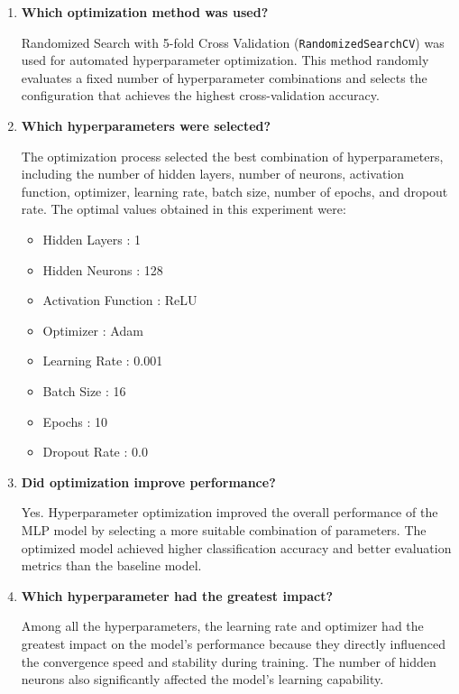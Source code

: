 \documentclass[11pt]{article}
\begin{document}
\begin{enumerate}

\item \textbf{Which optimization method was used?}

Randomized Search with 5-fold Cross Validation (\texttt{RandomizedSearchCV}) was used for automated hyperparameter optimization. This method randomly evaluates a fixed number of hyperparameter combinations and selects the configuration that achieves the highest cross-validation accuracy.

\vspace{0.3cm}

\item \textbf{Which hyperparameters were selected?}

The optimization process selected the best combination of hyperparameters, including the number of hidden layers, number of neurons, activation function, optimizer, learning rate, batch size, number of epochs, and dropout rate. The optimal values obtained in this experiment were:

\begin{itemize}
    \item Hidden Layers : 1
    \item Hidden Neurons : 128
    \item Activation Function : ReLU
    \item Optimizer : Adam
    \item Learning Rate : 0.001
    \item Batch Size : 16
    \item Epochs : 10
    \item Dropout Rate : 0.0
\end{itemize}


\vspace{0.3cm}

\item \textbf{Did optimization improve performance?}

Yes. Hyperparameter optimization improved the overall performance of the MLP model by selecting a more suitable combination of parameters. The optimized model achieved higher classification accuracy and better evaluation metrics than the baseline model.

\vspace{0.3cm}

\item \textbf{Which hyperparameter had the greatest impact?}

Among all the hyperparameters, the learning rate and optimizer had the greatest impact on the model's performance because they directly influenced the convergence speed and stability during training. The number of hidden neurons also significantly affected the model's learning capability.


\end{enumerate}
\end{document}
